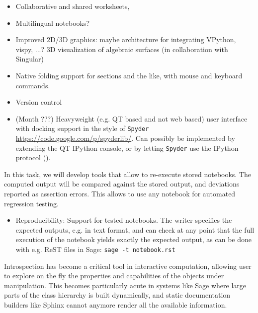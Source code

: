 \begin{workpackage}
\begin{tasklist}
\begin{task}[title=Notebook interface usability]

  \begin{itemize}
  \item Collaborative and shared worksheets,
  \item Multilingual notebooks?
  \item Improved 2D/3D graphics: maybe architecture for integrating
    VPython, vispy, ...? 3D visualization of algebraic surfaces (in
    collaboration with Singular)
  \item Native folding support for sections and the like, with mouse
    and keyboard commands.
  \item Version control
  \item {} (Month ???) Heavyweight (e.g. QT
    based and not web based) user interface with docking support in
    the style of \texttt{Spyder}
    \url{https://code.google.com/p/spyderlib/}. Can possibly be
    implemented by extending the QT IPython console, or by letting
    \texttt{Spyder} use the IPython protocol ().
  \end{itemize}
\end{task}

\begin{task}[id=notebook-verification,title=Using Notebooks for verification tests]
  In this task, we will develop tools that allow to re-execute stored
  notebooks. The computed output will be compared against the stored
  output, and deviations reported as assertion errors. This allows to
  use any notebook for automated regression testing.

  \begin{itemize}
  \item Reproducibility:  Support for tested
    notebooks. The writer specifies the expected outputs, e.g. in text
    format, and can check at any point that the full execution of the
    notebook yields exactly the expected output, as can be done with
    e.g. ReST files in Sage: \lstinline{sage -t notebook.rst}
  \end{itemize}
\end{task}

\begin{task}[title=Dynamic documentation and exploration system]

  Introspection has become a critical tool in interactive computation,
  allowing user to explore on the fly the properties and capabilities
  of the objects under manipulation. This becomes particularly acute
  in systems like Sage where large parts of the class hierarchy is
  built dynamically, and static documentation builders like Sphinx
  cannot anymore render all the available information.


\end{task}
\end{tasklist}
\end{workpackage}
